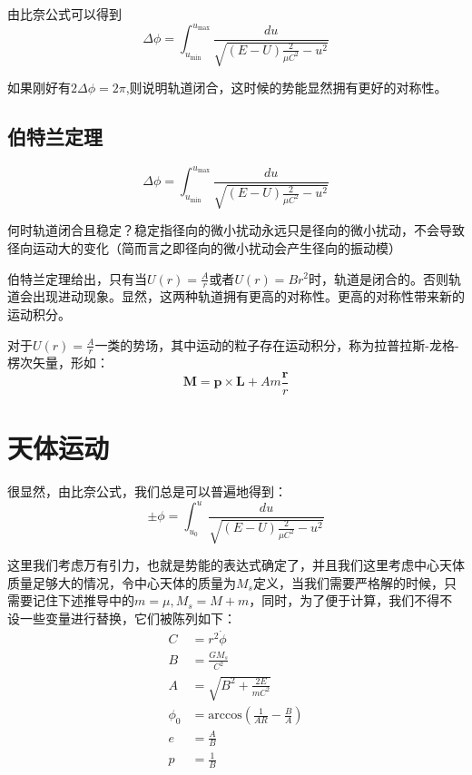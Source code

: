 \documentclass[a4paper, 10pt, openany]{book}%
\begin{document}
    由比奈公式可以得到
    \begin{equation}\Delta \phi=\int_{u_\text{min}}^{u_\text{max}}\frac{du}{\sqrt{(E-U)\frac{2}{\mu C^2}-u^2}}\end{equation}
    
    如果刚好有$2\Delta \phi=2\pi$,则说明轨道闭合，这时候的势能显然拥有更好的对称性。
    \subsection{伯特兰定理}
    \begin{equation}\Delta \phi=\int_{u_\text{min}}^{u_\text{max}}\frac{du}{\sqrt{(E-U)\frac{2}{\mu C^2}-u^2}}\end{equation}
    
    何时轨道闭合且稳定？稳定指径向的微小扰动永远只是径向的微小扰动，不会导致径向运动大的变化（简而言之即径向的微小扰动会产生径向的振动模）
    
    伯特兰定理给出，只有当$U(r)=\frac{A}{r}$或者$U(r)=Br^2$时，轨道是闭合的。否则轨道会出现进动现象。显然，这两种轨道拥有更高的对称性。更高的对称性带来新的运动积分。

    对于$U(r)=\frac{A}{r}$一类的势场，其中运动的粒子存在运动积分，称为拉普拉斯-龙格-楞次矢量，形如：
\begin{equation}
\textbf{M}=\textbf{p}\times\textbf{L}+Am\frac{\textbf{r}}{r}
\end{equation}

    \section{天体运动}
    很显然，由比奈公式，我们总是可以普遍地得到：
    \begin{equation}\pm\phi=\int_{u_0}^{u}\frac{du}{\sqrt{(E-U)\frac{2}{\mu C^2}-u^2}}\end{equation}

    这里我们考虑万有引力，也就是势能的表达式确定了，并且我们这里考虑中心天体质量足够大的情况，令中心天体的质量为$M_s$定义，当我们需要严格解的时候，只需要记住下述推导中的$m=\mu,M_s=M+m$，同时，为了便于计算，我们不得不设一些变量进行替换，它们被陈列如下：
    \begin{align}C&=r^2\dot{\phi}\\
    B&=\frac{GM_s}{C^2}\\
    A&=\sqrt{B^2+\frac{2E}{mC^2}}\\
    \phi_0&=\mathrm{arccos}(\frac{1}{AR}-\frac{B}{A})\\
  e&=\frac{A}{B}\\
  p&=\frac{1}{B}
  \end{align}
    
\end{document}
